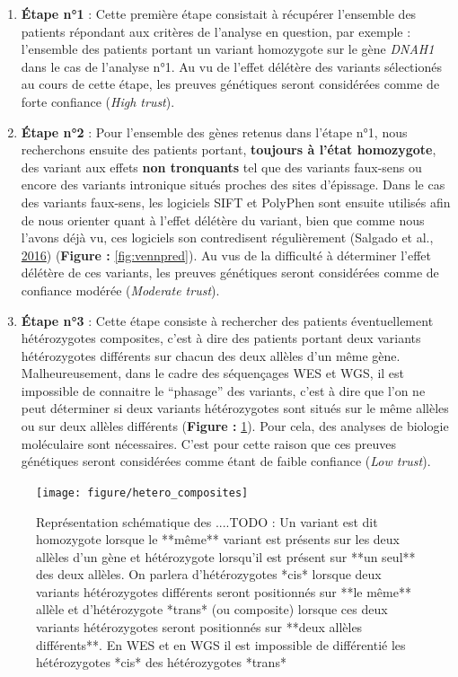 \documentclass[12pt,twoside]{reedthesis}
\theoremstyle{definition}
\theoremstyle{definition}
\theoremstyle{remark}
\begin{document}
  \begin{enumerate}
  \def\labelenumi{\arabic{enumi}.}
  \item
    \textbf{Étape n°1} : Cette première étape consistait à récupérer
    l'ensemble des patients répondant aux critères de l'analyse en
    question, par exemple : l'ensemble des patients portant un variant
    homozygote sur le gène \emph{DNAH1} dans le cas de l'analyse n°1. Au
    vu de l'effet délétère des variants sélectionés au cours de cette
    étape, les preuves génétiques seront considérées comme de forte
    confiance (\emph{High trust}).
  \item
    \textbf{Étape n°2} : Pour l'ensemble des gènes retenus dans l'étape
    n°1, nous recherchons ensuite des patients portant, \textbf{toujours à
    l'état homozygote}, des variant aux effets \textbf{non tronquants} tel
    que des variants faux-sens ou encore des variants intronique situés
    proches des sites d'épissage. Dans le cas des variants faux-sens, les
    logiciels SIFT et PolyPhen sont ensuite utilisés afin de nous orienter
    quant à l'effet délétère du variant, bien que comme nous l'avons déjà
    vu, ces logiciels son contredisent régulièrement (Salgado et al.,
    \protect\hyperlink{ref-Salgado2016}{2016}) (\textbf{Figure :}
    \ref{fig:vennpred}). Au vus de la difficulté à déterminer l'effet
    délétère de ces variants, les preuves génétiques seront considérées
    comme de confiance modérée (\emph{Moderate trust}).
  \item
    \textbf{Étape n°3} : Cette étape consiste à rechercher des patients
    éventuellement hétérozygotes composites, c'est à dire des patients
    portant deux variants hétérozygotes différents sur chacun des deux
    allèles d'un même gène. Malheureusement, dans le cadre des séquençages
    WES et WGS, il est impossible de connaitre le ``phasage'' des
    variants, c'est à dire que l'on ne peut déterminer si deux variants
    hétérozygotes sont situés sur le même allèles ou sur deux allèles
    différents (\textbf{Figure : }\ref{fig:compositehet}). Pour cela, des
    analyses de biologie moléculaire sont nécessaires. C'est pour cette
    raison que ces preuves génétiques seront considérées comme étant de
    faible confiance (\emph{Low trust}).
  \end{enumerate}
  
  \begin{figure}
  
  {\centering \texttt{[image: figure/hetero\_composites]} 
  
  }
  
  \caption[Représentation schématique des ....TODO]{Représentation schématique des ....TODO : Un variant est dit homozygote lorsque le **même** variant est présents sur les deux allèles d'un gène et hétérozygote lorsqu'il est présent sur **un seul** des deux allèles. On parlera d'hétérozygotes *cis* lorsque deux variants hétérozygotes différents seront positionnés sur **le même** allèle et d'hétérozygote *trans* (ou composite) lorsque ces deux variants hétérozygotes seront positionnés sur **deux allèles différents**. En WES et en WGS il est impossible de différentié les hétérozygotes *cis* des hétérozygotes *trans*}\label{fig:compositehet}
  \end{figure}
  
\end{document}
